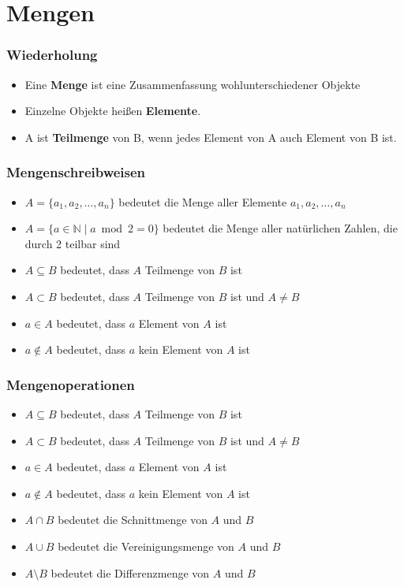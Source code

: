\section{Mengen}
\begin{frame}
    \frametitle{Wiederholung}
    \begin{itemize}
        \item Eine \textbf{Menge} ist eine Zusammenfassung wohlunterschiedener Objekte
        \item Einzelne Objekte heißen \textbf{Elemente}.
        \item A ist \textbf{Teilmenge} von B, wenn jedes Element von A auch Element von B ist.
    \end{itemize}
\end{frame}

\begin{frame}
    \frametitle{Mengenschreibweisen}
    \begin{itemize}
        \item $A = \{a_1, a_2, \dots, a_n\} $ bedeutet die Menge aller Elemente $a_1, a_2, \dots, a_n$
        \item $A = \{a \in \mathbb{N} \mid a \bmod 2 = 0\}$ bedeutet die Menge aller natürlichen Zahlen, die durch 2 teilbar sind
        \item $ A \subseteq B $ bedeutet, dass $ A $ Teilmenge von $ B $ ist
        \item $ A \subset B $ bedeutet, dass $ A $ Teilmenge von $ B $ ist und $ A \neq B $
        \item $a \in A$ bedeutet, dass $a$ Element von $A$ ist
        \item $a \notin A$ bedeutet, dass $a$ kein Element von $A$ ist
    \end{itemize}
\end{frame}

\begin{frame}
    \frametitle{Mengenoperationen}
    \begin{itemize}
        \item $ A \subseteq B $ bedeutet, dass $ A $ Teilmenge von $ B $ ist
        \item $ A \subset B $ bedeutet, dass $ A $ Teilmenge von $ B $ ist und $ A \neq B $
        \item $a \in A$ bedeutet, dass $a$ Element von $A$ ist
        \item $a \notin A$ bedeutet, dass $a$ kein Element von $A$ ist
        \item $A \cap B$ bedeutet die Schnittmenge von $A$ und $B$
        \item $A \cup B$ bedeutet die Vereinigungsmenge von $A$ und $B$
        \item $A \setminus B$ bedeutet die Differenzmenge von $A$ und $B$
    \end{itemize}
\end{frame}

